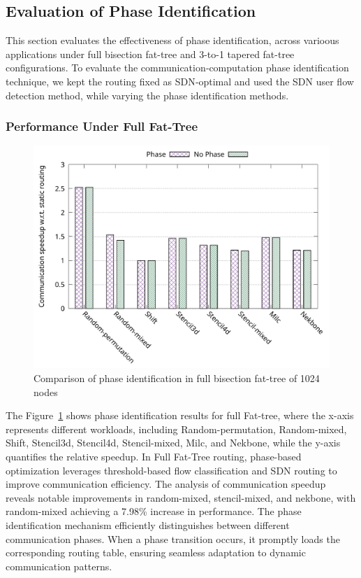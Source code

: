 \subsection{Evaluation of Phase Identification}
This section evaluates the effectiveness of phase identification, across varioous applications under full bisection fat-tree and 3-to-1 tapered fat-tree configurations. To evaluate the communication‑computation phase identification technique, we kept the routing fixed as SDN‑optimal and used the SDN user flow detection method, while varying the phase identification methods.

\subsubsection{Performance Under Full Fat-Tree}


\begin{figure}[h]
  \centering
  \includegraphics[width=\columnwidth]{./figs_4/phase_full.pdf}
  \caption{Comparison of phase identification in full bisection fat-tree of 1024 nodes}
  \label{fig:phase_full}
\end{figure}
The Figure~\ref{fig:phase_full} shows phase identification results for full Fat-tree, where the x-axis represents different workloads, including Random-permutation, Random-mixed, Shift, Stencil3d, Stencil4d, Stencil-mixed, Milc, and Nekbone, while the y-axis quantifies the relative speedup. 
In Full Fat-Tree routing, phase-based optimization leverages threshold-based flow classification and SDN routing to improve communication efficiency. The analysis of communication speedup reveals notable improvements in random-mixed, stencil-mixed, and nekbone, with random-mixed achieving a 7.98\% increase in performance. The phase identification mechanism efficiently distinguishes between different communication phases. When a phase transition occurs, it promptly loads the corresponding routing table, ensuring seamless adaptation to dynamic communication patterns.

